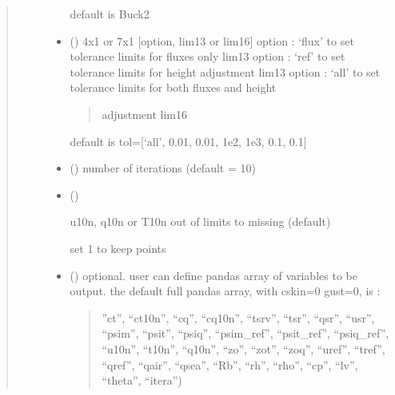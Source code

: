 \documentclass[letterpaper,10pt,english]{sphinxmanual}
\begin{document}
\begin{fulllineitems}
\begin{quote}
\begin{description}
\begin{itemize}
\begin{description}
\end{description}

\sphinxAtStartPar
default is Buck2


\item {} 
\sphinxAtStartPar
{} () \textendash{} 
\sphinxAtStartPar
4x1 or 7x1 {[}option, lim1\sphinxhyphen{}3 or lim1\sphinxhyphen{}6{]}
option : ‘flux’ to set tolerance limits for fluxes only lim1\sphinxhyphen{}3
option : ‘ref’ to set tolerance limits for height adjustment lim\sphinxhyphen{}1\sphinxhyphen{}3
option : ‘all’ to set tolerance limits for both fluxes and height
\begin{quote}

\sphinxAtStartPar
adjustment lim1\sphinxhyphen{}6
\end{quote}

\sphinxAtStartPar
default is tol={[}‘all’, 0.01, 0.01, 1e\sphinxhyphen{}2, 1e\sphinxhyphen{}3, 0.1, 0.1{]}


\item {} 
\sphinxAtStartPar
{} () \textendash{} number of iterations (default = 10)

\item {} 
\sphinxAtStartPar
{} () \textendash{} \begin{description}
\sphinxAtStartPar
u10n, q10n or T10n out of limits to missing (default)

\end{description}

\sphinxAtStartPar
set 1 to keep points


\item {} 
\sphinxAtStartPar
{} () \textendash{} 
\sphinxAtStartPar
optional. user can define pandas array of variables to be output.
the default full pandas array, with cskin=0 gust=0, is :
\begin{quote}
\begin{description}
\sphinxAtStartPar
”ct”, “ct10n”, “cq”, “cq10n”, “tsrv”, “tsr”, “qsr”,
“usr”, “psim”, “psit”, “psiq”, “psim\_ref”, “psit\_ref”,
“psiq\_ref”, “u10n”, “t10n”, “q10n”, “zo”, “zot”, “zoq”,
“uref”, “tref”, “qref”, “qair”, “qsea”, “Rb”, “rh”,
“rho”, “cp”, “lv”, “theta”, “itera”)


\end{description}
\end{quote}
\end{itemize}
\end{description}
\end{quote}
\end{fulllineitems}
\end{document}
